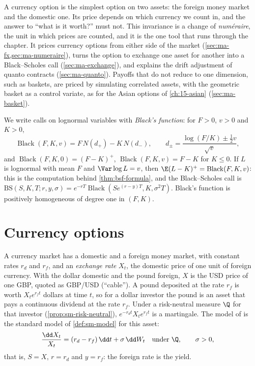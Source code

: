 \providecommand{\Corr}{\operatorname{Corr}}
\providecommand{\Black}{\operatorname{Black}}

A currency option is the simplest option on two assets: the foreign money market and the
domestic one. Its price depends on which currency we count in, and the answer to ``what is it
worth?'' must not. This invariance is a change of \emph{num\'eraire}, the unit in which prices
are counted, and it is the one tool that runs through the chapter. It prices currency options
from either side of the market (\cref{sec:ma-fx,sec:ma-numeraire}), turns the option to
exchange one asset for another into a Black--Scholes call (\cref{sec:ma-exchange}), and
explains the drift adjustment of quanto contracts (\cref{sec:ma-quanto}). Payoffs that do not
reduce to one dimension, such as baskets, are priced by simulating correlated assets, with the
geometric basket as a control variate, as for the Asian options of
\cref{ch:15-asian} (\cref{sec:ma-basket}).

We write calls on lognormal variables with \emph{Black's function}: for $F>0$, $v>0$ and $K>0$,
\begin{equation}\label{eq:ma-black}
  \Black(F,K,v)=F\,N(d_+)-K\,N(d_-),\qquad d_\pm=\frac{\log(F/K)\pm\frac12v}{\sqrt v},
\end{equation}
and $\Black(F,K,0)=(F-K)^+$, $\Black(F,K,v)=F-K$ for $K\le0$. If $L$ is lognormal with mean
$F$ and $\Var\log L=v$, then $\E(L-K)^+=\Black(F,K,v)$: this is the computation behind
\cref{thm:bsf-formula}, and the Black--Scholes call is
$\mathrm{BS}(S,K,T;r,y,\sigma)=e^{-rT}\Black(Se^{(r-y)T},K,\sigma^2T)$. Black's function is
positively homogeneous of degree one in $(F,K)$.

\section{Currency options}\label{sec:ma-fx}

A currency market has a domestic and a foreign money market, with constant rates $r_d$ and
$r_f$, and an \emph{exchange rate} $X_t$, the domestic price of one unit of foreign currency.
With the dollar domestic and the pound foreign, $X$ is the USD price of one GBP, quoted as
GBP/USD (``cable''). A pound deposited at the rate $r_f$ is worth $X_te^{r_ft}$ dollars at time
$t$, so for a dollar investor the pound is an asset that pays a continuous dividend at the rate
$r_f$. Under a risk-neutral measure $\Q$ for that investor (\cref{prop:sm-risk-neutral}),
$e^{-r_dt}X_te^{r_ft}$ is a martingale. The model of \textcite{garman-kohlhagen} is the
standard model of \cref{def:sm-model} for this asset:
\begin{equation}\label{eq:ma-gk}
  \frac{\dd X_t}{X_t}=(r_d-r_f)\,\dd t+\sigma\,\dd W_t\quad\text{under }\Q,\qquad\sigma>0,
\end{equation}
that is, $S=X$, $r=r_d$ and $y=r_f$: the foreign rate is the yield.

